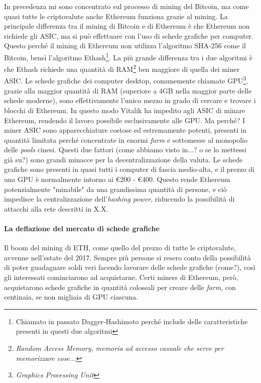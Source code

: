 \documentclass {article}
\begin{document}
In precedenza mi sono concentrato sul processo di mining del Bitcoin, ma come quasi tutte le criptovalute anche Ethereum funziona grazie al mining.
La principale differenza tra il mining di Bitcoin e di Ethereum è che Ethereum non richiede gli ASIC, ma si può effettuare con l'uso di schede grafiche per computer.
Questo perché il mining di Ethereum non utilizza l'algoritmo SHA-256 come il Bitcoin, bensì l'algoritmo Ethash\footnote{Chiamato in passato Dagger-Hashimoto perché include delle caratteristiche presenti in questi due algoritmi}.
La più grande differenza tra i due algoritmi è che Ethash richiede una quantità di RAM\footnote{\textit{Random Access Memory, memoria ad accesso casuale che serve per memorizzare cose...}} ben maggiore di quella dei miner ASIC. %
Le schede grafiche dei computer desktop, comunemente chiamate GPU\footnote{\textit{Graphics Processing Unit}}, grazie alla maggior quantità di RAM (superiore a 4GB nella maggior parte delle schede moderne), sono effettivamente l'unico mezzo in grado di cercare e trovare i blocchi di Ethereum.
In questo modo Vitalik ha impedito agli ASIC di minare Ethereum, rendendo il lavoro possibile esclusivamente alle GPU. Ma perché?
I miner ASIC sono apparecchiature costose ed estremamente potenti, presenti in quantità limitata perché concentrate in enormi \textit{farm} e sottomesse al monopolio delle \textit{pools} cinesi.
Questi due fattori (come abbiamo visto in...? o se lo mettessi già su?) sono grandi minacce per la decentralizzazione della valuta.
Le schede grafiche sono presenti in quasi tutti i computer di fascia medio-alta, e il prezzo di una GPU è normalmente intorno ai \euro{200} - \euro{400}.
Questo rende Ethereum potenzialmente "minabile" da una grandissima quantità di persone, e ciò impedisce la centralizzazione dell'\textit{hashing power}, riducendo la possibilità di attacchi alla rete descritti in X.X.

\paragraph {La deflazione del mercato di schede grafiche}

Il boom del mining di ETH, come quello del prezzo di tutte le criptovalute, avvenne nell'estate del 2017.
Sempre più persone si resero conto della possibilità di poter guadagnare soldi veri facendo lavorare delle schede grafiche (come?), così gli interessati cominciarono ad acquistarne.
Certi miners di Ethereum, però, acquistarono schede grafiche in quantità colossali per creare delle \textit{farm}, con centinaia, se non migliaia di GPU ciascuna.
\end{document}
